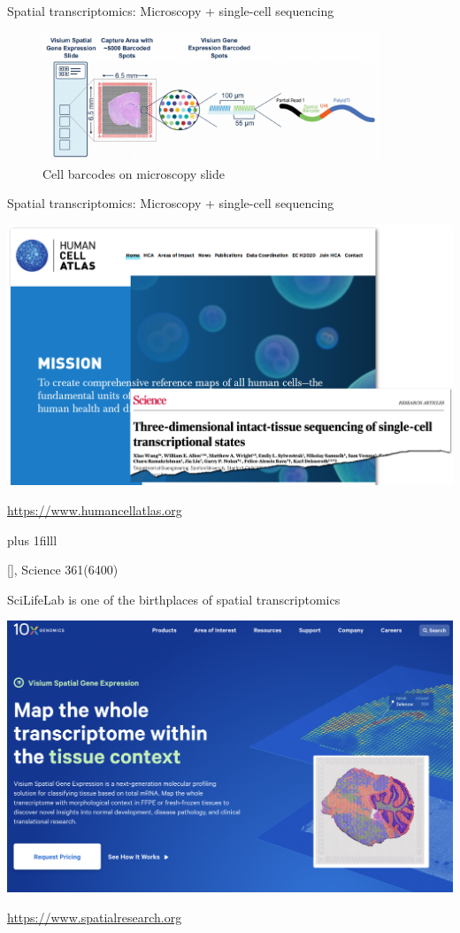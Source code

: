 \documentclass[10pt]{beamer}
\newcommand{\credit}[1]{{\vskip0pt plus 1filll \par \raggedleft \scriptsize \mdseries \color{mDarkBrown} #1 \par}}
\newcommand{\citeme}[1]{{\xspace\color{scAqua} \scriptsize [\cite{#1}]}}
\begin{document}
\begin{frame}{Spatial transcriptomics: Microscopy + single-cell sequencing}
	\begin{figure}
		\includegraphics[width=0.9\textwidth]{./figures/10x2.png}
		\caption{Cell barcodes on microscopy slide}
	\end{figure}
\end{frame}

\begin{frame}{Spatial transcriptomics: Microscopy + single-cell sequencing}
	\begin{center}
		\includegraphics[width=\textwidth]{./figures/hca.png} \\
	\end{center}
	\url{https://www.humancellatlas.org}
	\credit{\citeme{Wang2018}, Science 361(6400)}
\end{frame}

\begin{frame}{SciLifeLab is one of the birthplaces of spatial transcriptomics}
	\begin{center}
		\includegraphics[width=\textwidth]{./figures/visium10x.png} \\
	\end{center}
	\url{https://www.spatialresearch.org}
\end{frame}
\end{document}
